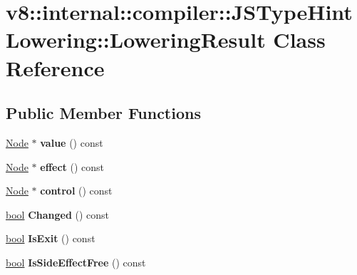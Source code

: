 \hypertarget{classv8_1_1internal_1_1compiler_1_1JSTypeHintLowering_1_1LoweringResult}{}\section{v8\+:\+:internal\+:\+:compiler\+:\+:J\+S\+Type\+Hint\+Lowering\+:\+:Lowering\+Result Class Reference}
\label{classv8_1_1internal_1_1compiler_1_1JSTypeHintLowering_1_1LoweringResult}
\subsection*{Public Member Functions}
\begin{DoxyCompactItemize}
\item 
\mbox{\label{classv8_1_1internal_1_1compiler_1_1JSTypeHintLowering_1_1LoweringResult_a36b12c0f15cfcf07e6d57c66b9df0ecc}} 
\mbox{\hyperlink{classv8_1_1internal_1_1compiler_1_1Node}{Node}} $\ast$ {\bfseries value} () const
\item 
\mbox{\label{classv8_1_1internal_1_1compiler_1_1JSTypeHintLowering_1_1LoweringResult_aadaa9e2487e6405c59fc400d3ed81408}} 
\mbox{\hyperlink{classv8_1_1internal_1_1compiler_1_1Node}{Node}} $\ast$ {\bfseries effect} () const
\item 
\mbox{\label{classv8_1_1internal_1_1compiler_1_1JSTypeHintLowering_1_1LoweringResult_aee01cc4a439e816aa0315f808737efb1}} 
\mbox{\hyperlink{classv8_1_1internal_1_1compiler_1_1Node}{Node}} $\ast$ {\bfseries control} () const
\item 
\mbox{\label{classv8_1_1internal_1_1compiler_1_1JSTypeHintLowering_1_1LoweringResult_aaff128243befb90b88f22614d94293fd}} 
\mbox{\hyperlink{classbool}{bool}} {\bfseries Changed} () const
\item 
\mbox{\label{classv8_1_1internal_1_1compiler_1_1JSTypeHintLowering_1_1LoweringResult_a69d8d0d5fb7ea68831cd54906ffd807a}} 
\mbox{\hyperlink{classbool}{bool}} {\bfseries Is\+Exit} () const
\item 
\mbox{\label{classv8_1_1internal_1_1compiler_1_1JSTypeHintLowering_1_1LoweringResult_a0d7c75f9f8ef5ff46d46b75357ecefd1}} 
\mbox{\hyperlink{classbool}{bool}} {\bfseries Is\+Side\+Effect\+Free} () const
\end{DoxyCompactItemize}
